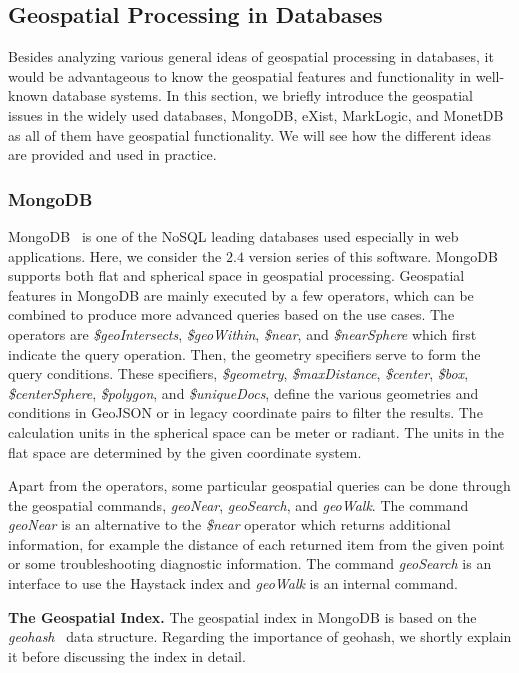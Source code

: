 \documentclass[a4paper,12pt]{article}
\begin{document}
\subsection{Geospatial Processing in Databases} 
\label{s.dbs}
Besides analyzing various general ideas of geospatial processing in databases, it would be advantageous to know the geospatial features and functionality in well-known database systems. In this section, we briefly introduce the geospatial issues in the widely used databases, MongoDB, eXist, MarkLogic, and MonetDB as all of them have geospatial functionality. We will see how the different ideas are provided and used in practice.

\subsubsection{MongoDB}
\label{mongo}
MongoDB~\cite{mongogeneral2010,mongoinaction2011} is one of the NoSQL leading databases used especially in web applications. Here, we consider the $2.4$ version series of this software. MongoDB supports both flat and spherical space in geospatial processing. Geospatial features in MongoDB are mainly executed by a few operators, which can be combined to produce more advanced queries based on the use cases. 
The operators are \textit{\$geo\-Intersects}, \textit{\$geo\-Within}, \textit{\$near}, and \textit{\$near\-Sphere} which first indicate the query operation. Then, the geometry specifiers serve to form the query conditions. These specifiers, \textit{\$geo\-metry}, \textit{\$max\-Distance}, \textit{\$center}, \textit{\$box}, \textit{\$center\-Sphere}, \textit{\$polygon}, and \textit{\$unique\-Docs}, define the various geo\-metries and conditions in GeoJSON or in legacy coordinate pairs to filter the results. The calculation units in the spherical space can be meter or radiant. The units in the flat space are determined by the given coordinate system. 

Apart from the operators, some particular geospatial queries can be done through the geospatial commands, 
\textit{geo\-Near}, \textit{geo\-Search}, and \textit{geo\-Walk}. The command \textit{geo\-Near} is an alternative to the \textit{\$near} operator which returns additional information, for example the distance of each returned item from the given point or some troubleshooting diagnostic information. The command \textit{geo\-Search} is an interface to use the Haystack index and \textit{geo\-Walk} is an internal command.

\textbf{The Geospatial Index.}
The geospatial index in MongoDB is based on the \textit{geo\-hash}~\cite{www/geohash} data structure. Regarding the importance of geohash, we shortly explain it before discussing the index in detail.
\end{document}
